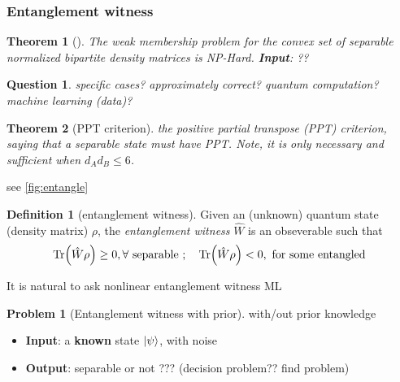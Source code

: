 \documentclass[
10pt,
aps,
pra,
linenumbers,
floatfix,
]{revtex4-2}
\theoremstyle{plain}
\newtheorem{theorem}{Theorem}
\newtheorem{question}{Question}
\theoremstyle{definition}
\newtheorem{definition}{Definition}
\newtheorem{problem}{Problem}
\newcommand{\ew}{\hat{W}}
\newcommand{\dm}{\rho}
\begin{document}
\subsubsection{Entanglement witness}\label{sec:entanglement_witness}
\begin{theorem}[\cite{gurvitsClassicalDeterministicComplexity2003}]
	The weak membership problem for the convex set of separable normalized bipartite density matrices is NP-Hard.
	\textbf{Input}: ??
\end{theorem}
\begin{question}
	specific cases? approximately correct? quantum computation? machine learning (data)?
\end{question}

\begin{theorem}[PPT criterion]
	the positive partial transpose (PPT) criterion, saying that a separable state must have PPT.
	Note, it is only necessary and sufficient when $d_A d_B \le 6$.
\end{theorem}
see \cref{fig:entangle}
\begin{definition}[entanglement witness]\label{def:entanglement_witness}
	Given an (unknown) quantum state (density matrix) $\dm$, the \emph{entanglement witness} $\ew$ is an obseverable such that
	\begin{equation}
		\Tr(\ew\dm) \ge 0 , \forall \text{ separable };\quad
		\Tr(\ew\dm) < 0 , \text{ for some entangled }
	\end{equation}
\end{definition}
It is natural to ask nonlinear entanglement witness \cite{guhneNonlinearEntanglementWitnesses2006}  
 ML

\begin{problem}[Entanglement witness with prior]
	with/out prior knowledge
	\begin{itemize}
		\item \textbf{Input}: a \textbf{known} state $\ket{\psi}$, with noise
		\item \textbf{Output}: separable or not ???
		(decision problem?? find problem)
	\end{itemize}
\end{problem}
\end{document}
